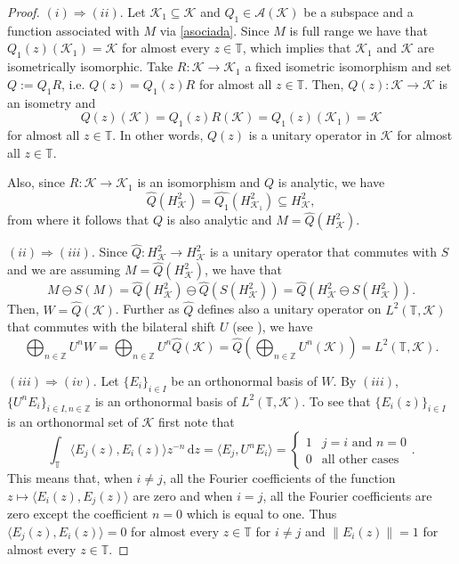 \documentclass[a4paper,12pt]{amsart}
\def\cA{{\mathcal{A}}}
\def\d{\,{\mathrm{d}}}
\def\KK{{\mathcal{K}}}
\def\T{{\mathbb{T}}}
\def\Z{{\mathbb{Z}}}
\newcommand{\norm}[1]{{\left\|{#1}\right\|}}
\newcommand{\scal}[1]{{\langle{#1}\rangle}}
\theoremstyle{definition}
\begin{document}
\begin{proof}
$(i)\Rightarrow(ii)$. 
Let $\KK_1\subseteq\KK$ and $Q_1\in\cA(\KK)$ be a subspace and a function associated with $M$ via \eqref{asociada}. Since $M$ is full range we have that $Q_1(z)(\KK_1)=\KK$ for almost every $z\in\T$, which implies that $\KK_1$ and $\KK$ are isometrically isomorphic. Take $R:\KK\to\KK_1$ a fixed isometric isomorphism and set $Q:=Q_1R$, i.e. $Q(z)=Q_1(z)R$ for almost all $z\in\T$. Then, $Q(z):\KK\to\KK$ is an isometry and
\begin{equation*}
Q(z)(\KK)=Q_1(z)R(\KK)=Q_1(z)(\KK_1)=\KK
\end{equation*}
for almost all $z\in\T$. In other words, $Q(z)$ is a unitary operator in $\KK$ for almost all $z\in\T$.

Also, since $R:\KK\to\KK_1$ is an isomorphism and $Q$ is analytic, we have
\begin{equation*}
\widehat{Q}(H^2_\KK)=\widehat{Q_1}(H^2_{\KK_1})\subseteq H^2_\KK,
\end{equation*}
from where it follows that $Q$ is also analytic and $M=\widehat{Q}(H^2_\KK)$.

$(ii)\Rightarrow (iii)$. Since $\widehat{Q}: H^2_\KK\to H^2_\KK$ is a unitary operator that commutes with $S$ and we are assuming $M=\widehat{Q}(H^2_\KK)$, we have that 
\begin{equation*}
M\ominus S(M)=\widehat{Q}(H^2_\KK)\ominus\widehat{Q}(S(H^2_\KK))=\widehat{Q}(H^2_\KK\ominus S(H^2_\KK)).
\end{equation*}
Then, $W=\widehat{Q}(\KK)$. Further as $\widehat{Q}$ defines also a unitary operator on $L^2(\T,\KK)$ that commutes with the bilateral shift $U$ (see \cite[Corollary 3.19]{RR}), we have 
\begin{equation*}
\bigoplus_{n\in\Z}U^nW=\bigoplus_{n\in\Z}U^n\widehat{Q}(\KK)=\widehat{Q}\left(\bigoplus_{n\in\Z}U^n(\KK)\right)=L^2(\T,\KK).
\end{equation*}

$(iii)\Rightarrow(iv)$. Let $\{E_i\}_{i\in I}$ be an orthonormal basis of $W$. By $(iii)$, $\{U^nE_i\}_{ i\in I,n\in\Z}$ is an orthonormal basis of $L^2(\T,\KK)$. To see that $\{E_i(z)\}_{i\in I}$ is an orthonormal set of $\KK$ first note that
\begin{equation*}
\int_\T\scal{E_j(z), E_i(z)}z^{-n}\d z=\scal{E_j,U^n E_i}=\begin{cases}1&j=i\text{ and }n=0\\0&\text{all other cases}\end{cases}.
\end{equation*}
This means that, when $i\neq j$, all the Fourier coefficients of the function $z\mapsto\scal{ E_i(z),E_j(z)}$ are zero and when $i=j$, all the Fourier coefficients are zero except the coefficient $n=0$ which is equal to one. Thus $\scal{E_j(z),E_i(z)}=0$ for almost every $z\in\T$ for $i\neq j$ and $\norm{E_i(z)}=1$ for almost every $z\in\T$.


\end{proof}
\end{document}
